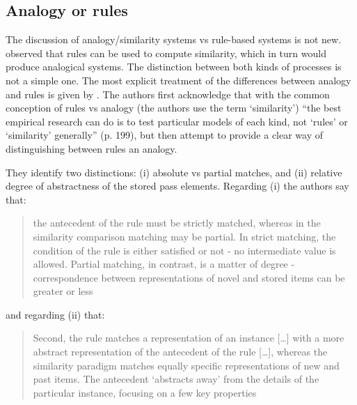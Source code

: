 \subsection{Analogy or rules}


The discussion of analogy/similarity systems vs rule-based systems is not new. \textcite{Nosofsky.1989} observed that rules can be used to compute similarity, which in turn would produce analogical systems. The distinction between both kinds of processes is not a simple one. The most explicit treatment of the differences between analogy and rules is given by \textcite{Hahn.1998}. The authors first acknowledge that with the common conception of rules vs analogy (the authors use the term `similarity') ``the best empirical research can do is to test particular models of each kind, not `rules' or `similarity' generally'' (p. 199), but then attempt to provide a clear way of distinguishing between rules an analogy.

They identify two distinctions: (i) absolute vs partial matches, and (ii) relative degree of abstractness of the stored pass elements. Regarding (i) the authors say that:

\begin{quotation}
the antecedent of the rule must be strictly matched, whereas in the similarity comparison matching may be partial. In strict matching, the condition of the rule is either  satisfied  or  not  - no  intermediate  value  is  allowed.  Partial  matching,  in contrast, is a matter of degree - correspondence between representations of novel and  stored  items  can  be  greater  or less \autocite[p. 202]{Hahn.1998}
\end{quotation}

and regarding (ii) that:

\begin{quotation}
  Second,  the  rule  matches  a  representation  of  an  instance [\dots] with a more abstract representation of the antecedent of the rule [\dots], whereas the similarity paradigm matches equally specific representations of new and past items. The antecedent ‘abstracts away’ from the details of the particular instance, focusing on a few key properties \autocite[p. 202]{Hahn.1998}
\end{quotation}

